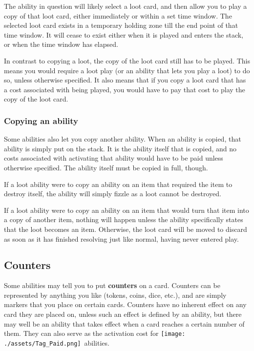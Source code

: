 \documentclass[10pt, a4paper, twoside]{article} %
\newcommand{\pay}{\texttt{[image: ./assets/Tag\_Paid.png]}}
\begin{document}
    The ability in question will likely select a loot card, and then allow you to play a copy of that loot card, either immediately or within a set time window. The selected loot card exists in a temporary holding zone till the end point of that time window. It will cease to exist either when it is played and enters the stack, or when the time window has elapsed.

    In contrast to copying a loot, the copy of the loot card still has to be played. This means you would require a loot play (or an ability that lets you play a loot) to do so, unless otherwise specified. It also means that if you copy a loot card that has a cost associated with being played, you would have to pay that cost to play the copy of the loot card.
    \subsubsection*{Copying an ability}
    Some abilities also let you copy another ability. When an ability is copied, that ability is simply put on the stack. It is the ability itself that is copied, and no costs associated with activating that ability would have to be paid unless otherwise specified. The ability itself must be copied in full, though.

    If a loot ability were to copy an ability on an item that required the item to destroy itself, the ability will simply fizzle as a loot cannot be destroyed.

    If a loot ability were to copy an ability on an item that would turn that item into a copy of another item, nothing will happen unless the ability specifically states that the loot becomes an item. Otherwise, the loot card will be moved to discard as soon as it has finished resolving just like normal, having never entered play.
    \subsection{Counters}
    \label{counters}
    Some abilities may tell you to put \textbf{counters} on a card. Counters can be represented by anything you like (tokens, coins, dice, etc.), and are simply markers that you place on certain cards. Counters have no inherent effect on any card they are placed on, unless such an effect is defined by an ability, but there may well be an ability that takes effect when a card reaches a certain number of them. They can also serve as the activation cost for \pay\ abilities.
\end{document}
